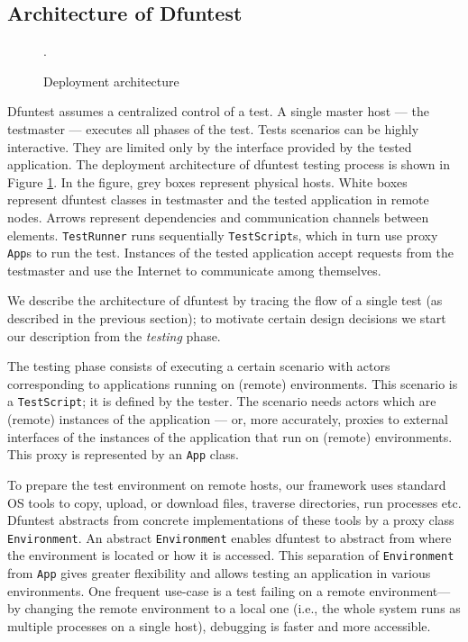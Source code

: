 \subsection{Architecture of Dfuntest}

\begin{figure}[tbp]
  \centering
  \def\svgwidth{\columnwidth}
  \scriptsize {
  
}
\caption{Deployment architecture}
\label{fig:4_deployment_architecture}.
\end{figure}

Dfuntest assumes a centralized control of a test. A single master
host --- the testmaster --- executes all phases of the test.
Tests scenarios can be highly interactive.
They are limited only by the interface provided by the tested application.
The deployment architecture of dfuntest testing process is shown in Figure \ref{fig:4_deployment_architecture}.
In the figure, grey boxes represent physical hosts.
White boxes represent dfuntest classes in testmaster and the tested application in remote nodes.
Arrows represent dependencies and communication channels between elements. 
\texttt{TestRunner} runs sequentially \texttt{TestScript}s, which in turn use proxy \texttt{App}s to run the test.
Instances of the tested application accept requests from the testmaster and use the Internet to communicate among themselves.

We describe the architecture of dfuntest by tracing the flow of a single test (as
described in the previous section); to motivate certain design decisions we
start our description from the \emph{testing} phase.

The testing phase consists of executing a certain scenario with actors
corresponding to applications running on (remote) environments.
This scenario is a \texttt{TestScript}; it is defined by the tester. The
scenario needs actors which are (remote) instances of the application --- or, more
accurately, proxies to external interfaces of the instances of the application that run on (remote) 
environments.
This proxy is represented by an \texttt{App} class.

To prepare the test environment on remote hosts, our framework uses standard OS
tools to copy, upload, or download files, traverse directories, run processes
etc.  Dfuntest abstracts from concrete implementations of these tools by a proxy
class \texttt{Environment}.
An abstract \texttt{Environment} enables dfuntest to abstract from where the
environment is located or how it is accessed.
This separation of \texttt{Environment} from \texttt{App} gives greater
flexibility and allows testing an application in various environments.
One frequent use-case is a test failing on a remote environment---by changing
the remote environment to a local one (i.e., the whole system runs as multiple
processes on a single host), debugging is faster and more accessible.

